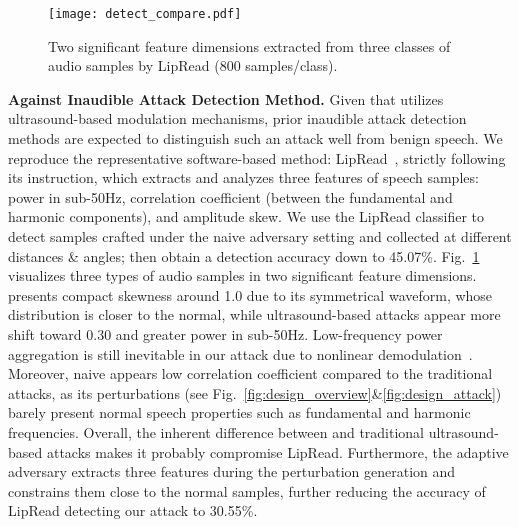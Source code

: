 
\begin{figure}[t]
    \centering
    \texttt{[image: detect\_compare.pdf]}
    \caption{Two significant feature dimensions extracted from three classes of audio samples by LipRead (800 samples/class).}
    \label{fig:detect_compare}
    \vspace{-10pt}
\end{figure}

\textbf{Against Inaudible Attack Detection Method.} 
Given that \alias utilizes ultrasound-based modulation mechanisms, prior inaudible attack detection methods are expected to distinguish such an attack well from benign speech. We reproduce the representative software-based method: LipRead~\cite{roy2018inaudible}, strictly following its instruction, which extracts and analyzes three features of speech samples: power in sub-50Hz, correlation coefficient (between the fundamental and harmonic components), and amplitude skew. 
We use the LipRead classifier to detect \alias samples crafted under the naive adversary setting and collected at different distances \& angles; then obtain a detection accuracy down to 45.07\%. Fig.~\ref{fig:detect_compare} visualizes three types of audio samples in two significant feature dimensions. \alias presents compact skewness around 1.0 due to its symmetrical waveform, whose distribution is closer to the normal, while ultrasound-based attacks appear more shift toward 0.30 and greater power in sub-50Hz. Low-frequency power aggregation is still inevitable in our attack due to nonlinear demodulation~\cite{roy2018inaudible}. Moreover, naive \alias appears low correlation coefficient compared to the traditional attacks, as its perturbations (see Fig.~\ref{fig:design_overview}\&\ref{fig:design_attack}) barely present normal speech properties such as fundamental and harmonic frequencies. 
Overall, the inherent difference between \alias and traditional ultrasound-based attacks makes it probably compromise LipRead.
Furthermore, the adaptive adversary extracts three features during the perturbation generation and constrains them close to the normal samples, further reducing the accuracy of LipRead detecting our attack to 30.55\%.